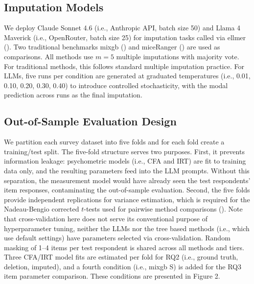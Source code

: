 \documentclass[
  man,
  floatsintext,
  longtable,
  nolmodern,
  notxfonts,
  notimes,
  colorlinks=true,linkcolor=blue,citecolor=blue,urlcolor=blue]{apa7}
\begin{document}
\subsection{Imputation Models}\label{imputation-models}

We deploy Claude Sonnet 4.6 (i.e., Anthropic API, batch size 50) and
Llama 4 Maverick (i.e., OpenRouter, batch size 25) for imputation tasks
called via ellmer (). Two
traditional benchmarks mixgb () and miceRanger () are used as comparisons. All methods use \(m = 5\) multiple
imputations with majority vote. For traditional methods, this follows
standard multiple imputation practice. For LLMs, five runs per condition
are generated at graduated temperatures (i.e., 0.01, 0.10, 0.20, 0.30,
0.40) to introduce controlled stochasticity, with the modal prediction
across runs as the final imputation.

\subsection{Out-of-Sample Evaluation
Design}\label{out-of-sample-evaluation-design}

We partition each survey dataset into five folds and for each fold
create a training/test split. The five-fold structure serves two
purposes. First, it prevents information leakage: psychometric models
(i.e., CFA and IRT) are fit to training data only, and the resulting
parameters feed into the LLM prompts. Without this separation, the
measurement model would have already seen the test respondents' item
responses, contaminating the out-of-sample evaluation. Second, the five
folds provide independent replications for variance estimation, which is
required for the Nadeau-Bengio corrected \(t\)-tests used for pairwise
method comparisons ().
Note that cross-validation here does not serve its conventional purpose
of hyperparameter tuning, neither the LLMs nor the tree based methods
(i.e., which use default settings) have parameters selected via
cross-validation. Random masking of 1--4 items per test respondent is
shared across all methods and tiers. Three CFA/IRT model fits are
estimated per fold for RQ2 (i.e., ground truth, deletion, imputed), and
a fourth condition (i.e., mixgb S) is added for the RQ3 item parameter
comparison. These conditions are presented in Figure 2.
\end{document}
